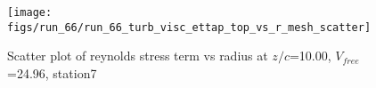 \begin{figure}[H]
\centering
\texttt{[image: figs/run\_66/run\_66\_turb\_visc\_ettap\_top\_vs\_r\_mesh\_scatter]}
\caption{Scatter plot of reynolds stress term vs radius at $z/c$=10.00, $V_{free}$=24.96, station7}
\label{fig:run_66_turb_visc_ettap_top_vs_r_mesh_scatter}
\end{figure}


